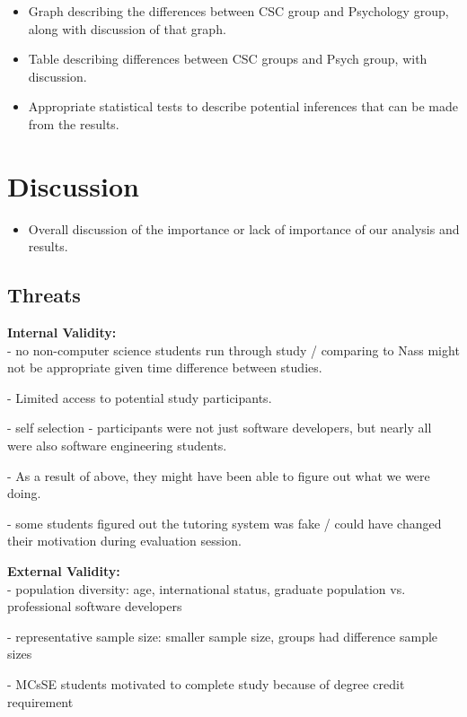 \documentclass{sig-alternate-05-2015}
\begin{document}
{\begin{itemize}
    \item Graph describing the differences between CSC group and Psychology group, along with discussion of that graph.
    \item Table describing differences between CSC groups and Psych group, with discussion.
    \item Appropriate statistical tests to describe potential inferences that can be made from the results.
\end{itemize}

\section{Discussion}

\begin{itemize}
    \item Overall discussion of the importance or lack of importance of our analysis and results.
\end{itemize}

\subsection{Threats}

\noindent \textbf{Internal Validity:} \\

- no non-computer science students run through study / comparing to Nass might not be appropriate given time difference between studies. 

- Limited access to potential study participants. 

- self selection - participants were not just software developers, but nearly all were also software engineering students. 

- As a result of above, they might have been able to figure out what we were doing. 

- some students figured out the tutoring system was fake / could have changed their motivation during evaluation session. 


\noindent \textbf{External Validity:} \\

- population diversity: age, international status, graduate population vs. professional software developers

- representative sample size: smaller sample size, groups had difference sample sizes

- MCsSE students motivated to complete study because of degree credit requirement


}
\end{document}

